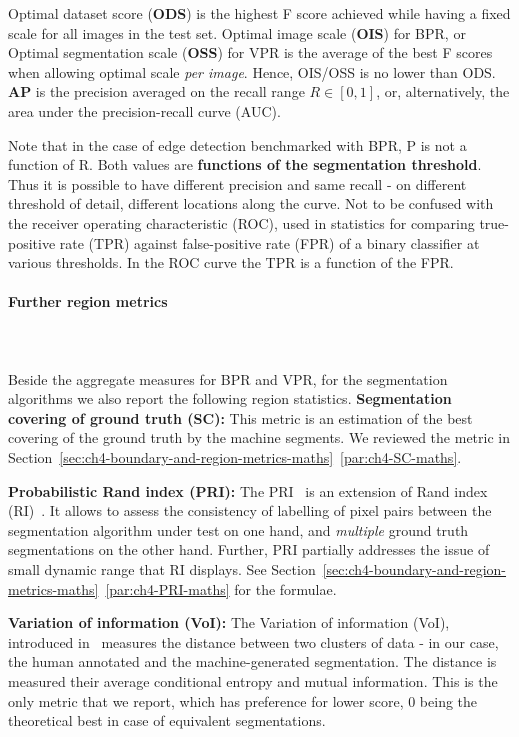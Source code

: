 Optimal dataset score ({\bf ODS}) is the highest F score achieved while having a fixed scale for all images in the test set. 
Optimal image scale ({\bf OIS}) for BPR, or Optimal segmentation scale (\textbf{OSS}) for VPR is the average of the best F scores when allowing optimal scale {\it per image}. Hence, OIS\slash OSS is no lower than ODS. 
{\bf AP} is the precision averaged on the recall range $R\in[0,1]$, or, alternatively, the area under the precision-recall curve (AUC).

Note that in the case of edge detection benchmarked with BPR, P is not a function of R. Both values are {\bf functions of the segmentation threshold}. Thus it is possible to have different precision and same recall - on different threshold of detail, \ie different locations along the curve.
Not to be confused with %
the receiver operating characteristic (ROC), used in statistics for comparing true-positive rate (TPR) against false-positive rate (FPR) of a binary classifier at various thresholds. In the ROC curve the TPR %
is a function of the FPR. %

\paragraph*{Further region metrics}\mbox{}\\\mbox{}\\
Beside the aggregate measures for BPR and VPR, for the segmentation algorithms we also report the following region statistics. %
\textbf{Segmentation covering of ground truth (SC):} This metric is an estimation of the best covering of the ground truth by the machine segments. We reviewed the metric in Section~\ref*{sec:ch4-boundary-and-region-metrics-maths}~\ref{par:ch4-SC-maths}.

\textbf{Probabilistic Rand index (PRI):} The PRI~\cite{UnnikrishnanPH07} is an extension of Rand index (RI)~\cite{rand1971objective}. It allows to assess the consistency of labelling of pixel pairs between the segmentation algorithm under test on one hand, and {\it multiple} ground truth segmentations on the other hand. Further, PRI partially addresses the issue of small dynamic range that RI displays. See Section~\ref*{sec:ch4-boundary-and-region-metrics-maths}~\ref{par:ch4-PRI-maths} for the formulae.

\textbf{Variation of information (VoI):} The Variation of information (VoI), introduced in~\cite{Meila05} measures the distance between two clusters of data - in our case, the human annotated and the machine-generated segmentation. The distance is measured \wrt %
their average conditional entropy and mutual information. This is the only metric that we report, which has preference for lower score, 0 being the theoretical best in case of equivalent segmentations.

